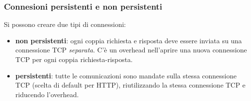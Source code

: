 \subsubsection{Connesioni persistenti e non persistenti}
Si possono creare due tipi di connessioni:
\begin{itemize}
  \item \textbf{non persistenti}: ogni coppia richiesta e risposta deve essere inviata su una connessione TCP \textit{separata}. C'è un overhead nell'aprire una nuova connessione TCP per ogni coppia richiesta-risposta.
  \item \textbf{persistenti}: tutte le comunicazioni sono mandate sulla stessa connessione TCP (scelta di default per HTTP), riutilizzando la stessa connessione TCP e riducendo l'overhead.
\end{itemize}

